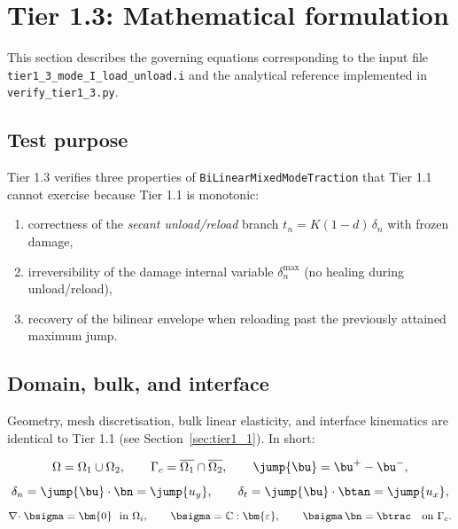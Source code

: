 \section{Tier 1.3: Mathematical formulation}
\label{sec:tier1_3}

This section describes the governing equations corresponding to the input file
\texttt{tier1\_3\_mode\_I\_load\_unload.i} and the analytical reference
implemented in \texttt{verify\_tier1\_3.py}.

\subsection{Test purpose}

Tier 1.3 verifies three properties of \texttt{BiLinearMixedModeTraction}
that Tier 1.1 cannot exercise because Tier 1.1 is monotonic:

\begin{enumerate}
\item correctness of the \emph{secant unload/reload} branch
      $t_n = K(1-d)\,\delta_n$ with frozen damage,
\item irreversibility of the damage internal variable
      $\delta_n^{\max}$ (no healing during unload/reload),
\item recovery of the bilinear envelope when reloading past the previously
      attained maximum jump.
\end{enumerate}

\subsection{Domain, bulk, and interface}

Geometry, mesh discretisation, bulk linear elasticity, and interface
kinematics are identical to Tier 1.1
(see Section~\ref{sec:tier1_1}). In short:

\begin{equation}
\Omega = \Omega_1\cup\Omega_2,\qquad
\Gamma_c = \overline{\Omega_1}\cap\overline{\Omega_2},\qquad
\jump{\bu} = \bu^{+}-\bu^{-},
\end{equation}
\begin{equation}
\delta_n = \jump{\bu}\cdot\bn = \jump{u_y},\qquad
\delta_t = \jump{\bu}\cdot\btan = \jump{u_x},
\end{equation}
\begin{equation}
\nabla\!\cdot\bsigma = \bm{0}\ \ \text{in }\Omega_i,\qquad
\bsigma = \mathbb{C}:\bm{\varepsilon},\qquad
\bsigma\,\bn = \btrac\quad\text{on }\Gamma_c.
\end{equation}

